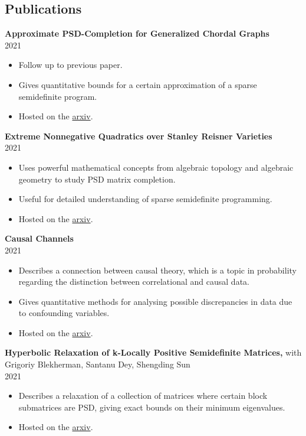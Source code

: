 \documentclass[margin]{res}
\begin{document}
\begin{resume}
\section{Publications}
{\bf  Approximate PSD-Completion for Generalized Chordal Graphs  } \\ 2021
\begin{itemize} \itemsep -2pt %
\item Follow up to previous paper.
\item Gives quantitative bounds for a certain approximation of a sparse semidefinite program.
\item Hosted on the \href{https://arxiv.org/abs/2107.11436}{arxiv}.
\end{itemize}
{\bf    Extreme Nonnegative Quadratics over Stanley Reisner Varieties} \\ 2021
\begin{itemize} \itemsep -2pt %
\item Uses powerful mathematical concepts from algebraic topology and algebraic geometry to study PSD matrix completion.
\item Useful for detailed understanding of sparse semidefinite programming.
\item Hosted on the \href{https://arxiv.org/abs/2106.13894}{arxiv}.
\end{itemize}
{\bf    Causal Channels} \\ 2021
\begin{itemize} \itemsep -2pt %
\item Describes a connection between causal theory, which is a topic in probability regarding the distinction between correlational and causal data.
\item Gives quantitative methods for analysing possible discrepancies in data due to confounding variables.
\item Hosted on the \href{https://arxiv.org/abs/2103.02834}{arxiv}.
\end{itemize}
{\bf    Hyperbolic Relaxation of k-Locally Positive Semidefinite Matrices,} with Grigoriy Blekherman, Santanu Dey, Shengding Sun\\ 2021
\begin{itemize} \itemsep -2pt %
\item Describes a relaxation of a collection of matrices where certain block submatrices are PSD, giving exact bounds on their minimum eigenvalues.
\item Hosted on the \href{https://arxiv.org/abs/2012.04031}{arxiv}.

\end{itemize}
\end{resume}
\end{document}
